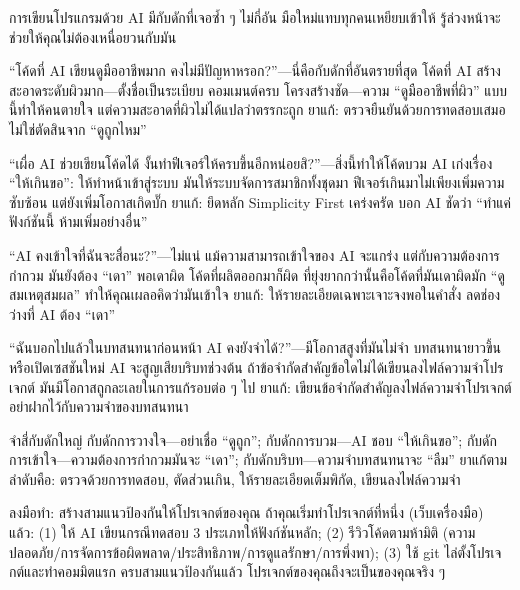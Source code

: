 
การเขียนโปรแกรมด้วย AI มีกับดักที่เจอซ้ำ ๆ ไม่กี่อัน มือใหม่แทบทุกคนเหยียบเข้าให้ รู้ล่วงหน้าจะช่วยให้คุณไม่ต้องเหนื่อยวนกับมัน


“โค้ดที่ AI เขียนดูมืออาชีพมาก คงไม่มีปัญหาหรอก?”—นี่คือกับดักที่อันตรายที่สุด โค้ดที่ AI สร้างสะอาดระดับผิวมาก—ตั้งชื่อเป็นระเบียบ คอมเมนต์ครบ โครงสร้างชัด—ความ “ดูมืออาชีพที่ผิว” แบบนี้ทำให้คนตายใจ แต่ความสะอาดที่ผิวไม่ได้แปลว่าตรรกะถูก ยาแก้: ตรวจยืนยันด้วยการทดสอบเสมอ ไม่ใช่ตัดสินจาก “ดูถูกไหม”


“เผื่อ AI ช่วยเขียนโค้ดได้ งั้นทำฟีเจอร์ให้ครบขึ้นอีกหน่อยสิ?”—สิ่งนี้ทำให้โค้ดบวม AI เก่งเรื่อง “ให้เกินขอ”: ให้ทำหน้าเข้าสู่ระบบ มันให้ระบบจัดการสมาชิกทั้งชุดมา ฟีเจอร์เกินมาไม่เพียงเพิ่มความซับซ้อน แต่ยังเพิ่มโอกาสเกิดบั๊ก ยาแก้: ยึดหลัก Simplicity First เคร่งครัด บอก AI ชัดว่า “ทำแค่ฟังก์ชันนี้ ห้ามเพิ่มอย่างอื่น”


“AI คงเข้าใจที่ฉันจะสื่อนะ?”—ไม่แน่ แม้ความสามารถเข้าใจของ AI จะแกร่ง แต่กับความต้องการกำกวม มันยังต้อง “เดา” พอเดาผิด โค้ดที่ผลิตออกมาก็ผิด ที่ยุ่งยากกว่านั้นคือโค้ดที่มันเดาผิดมัก “ดูสมเหตุสมผล” ทำให้คุณเผลอคิดว่ามันเข้าใจ ยาแก้: ให้รายละเอียดเฉพาะเจาะจงพอในคำสั่ง ลดช่องว่างที่ AI ต้อง “เดา”


“ฉันบอกไปแล้วในบทสนทนาก่อนหน้า AI คงยังจำได้?”—มีโอกาสสูงที่มันไม่จำ บทสนทนายาวขึ้นหรือเปิดเซสชันใหม่ AI จะสูญเสียบริบทช่วงต้น ถ้าข้อจำกัดสำคัญข้อใดไม่ได้เขียนลงไฟล์ความจำโปรเจกต์ มันมีโอกาสถูกละเลยในการแก้รอบต่อ ๆ ไป ยาแก้: เขียนข้อจำกัดสำคัญลงไฟล์ความจำโปรเจกต์ อย่าฝากไว้กับความจำของบทสนทนา

\begin{tcbwarn}{จำสี่กับดักใหญ่}
กับดักการวางใจ—อย่าเชื่อ “ดูถูก”; กับดักการบวม—AI ชอบ “ให้เกินขอ”; กับดักการเข้าใจ—ความต้องการกำกวมมันจะ “เดา”; กับดักบริบท—ความจำบทสนทนาจะ “ลืม” ยาแก้ตามลำดับคือ: ตรวจด้วยการทดสอบ, ตัดส่วนเกิน, ให้รายละเอียดเต็มพิกัด, เขียนลงไฟล์ความจำ

\end{tcbwarn}

\begin{tcbpractice}{ลงมือทำ: สร้างสามแนวป้องกันให้โปรเจกต์ของคุณ}
ถ้าคุณเริ่มทำโปรเจกต์ที่หนึ่ง (เว็บเครื่องมือ) แล้ว: (1) ให้ AI เขียนกรณีทดสอบ 3 ประเภทให้ฟังก์ชันหลัก; (2) รีวิวโค้ดตามห้ามิติ (ความปลอดภัย/การจัดการข้อผิดพลาด/ประสิทธิภาพ/การดูแลรักษา/การพึ่งพา); (3) ใช้ git ไล่ตั้งโปรเจกต์และทำคอมมิตแรก ครบสามแนวป้องกันแล้ว โปรเจกต์ของคุณถึงจะเป็นของคุณจริง ๆ

\end{tcbpractice}

